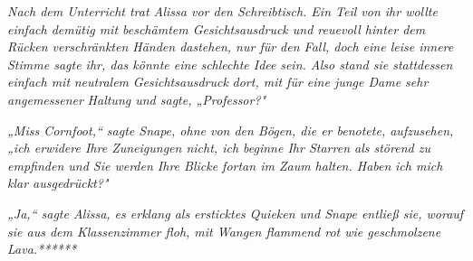 {\emph{Nach dem Unterricht trat Alissa vor den Schreibtisch. Ein Teil von ihr wollte einfach demütig mit beschämtem Gesichtsausdruck und reuevoll hinter dem Rücken verschränkten Händen dastehen, nur für den Fall, doch eine leise innere Stimme sagte ihr, das könnte eine} \emph{\emph{schlechte Idee}} \emph{sein. Also stand sie stattdessen einfach mit} \emph{neutralem} \emph{Gesichtsausdruck} \emph{dort, mit für eine junge Dame sehr angemessener} \emph{Haltung und sagte, „Professor?"}

\emph{„Miss Cornfoot,“ sagte Snape, ohne von den Bögen, die er benotete, aufzusehen, „ich erwidere Ihre Zuneigungen nicht, ich beginne Ihr Starren als störend zu empfinden und Sie werden Ihre Blicke fortan im Zaum halten. Haben} \emph{ich mich klar ausgedrückt?"}

\emph{„Ja,“ sagte Alissa, es erklang als ersticktes Quieken und Snape entließ sie, worauf sie aus dem Klassenzimmer floh, mit Wangen flammend rot wie geschmolzene Lava.******}

}
